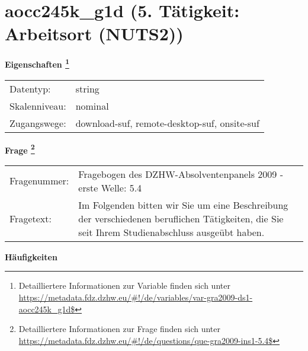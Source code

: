 
    \setcounter{footnote}{0}

    \vspace*{-1.8cm}
	\section{aocc245k\_g1d (5. Tätigkeit: Arbeitsort (NUTS2))}
	\label{section:aocc245k_g1d}



    \vspace*{0.5cm}
    \noindent\textbf{Eigenschaften
	\footnote{Detailliertere Informationen zur Variable finden sich unter
		\url{https://metadata.fdz.dzhw.eu/\#!/de/variables/var-gra2009-ds1-aocc245k_g1d$}}}\\
	\begin{tabularx}{\hsize}{@{}lX}
	Datentyp: & string \\
	Skalenniveau: & nominal \\
	Zugangswege: &
	  download-suf, 
	  remote-desktop-suf, 
	  onsite-suf
 \\
    \end{tabularx}



				\vspace*{0.5cm}
                \noindent\textbf{Frage
	                \footnote{Detailliertere Informationen zur Frage finden sich unter
		              \url{https://metadata.fdz.dzhw.eu/\#!/de/questions/que-gra2009-ins1-5.4$}}}\\
				\begin{tabularx}{\hsize}{@{}lX}
					Fragenummer: &
					  Fragebogen des DZHW-Absolventenpanels 2009 - erste Welle:
					  5.4
 \\
					Fragetext: & Im Folgenden bitten wir Sie um eine Beschreibung der verschiedenen beruflichen Tätigkeiten, die Sie seit Ihrem Studienabschluss ausgeübt haben. \\
				\end{tabularx}





        		\vspace*{0.5cm}
                \noindent\textbf{Häufigkeiten}

